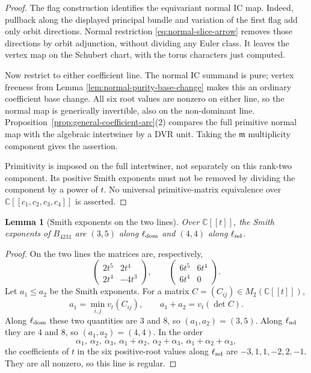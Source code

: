 \documentclass[11pt]{amsart}
\newtheorem{lemma}[theorem]{Lemma}
\theoremstyle{definition}
\theoremstyle{remark}
\newcommand{\C}{\mathbb C}
\begin{document}
\begin{proof}
The flag construction identifies the equivariant normal IC map.
Indeed, pullback along the displayed principal bundle and variation
of the first flag add only orbit directions.  Normal restriction
\eqref{eq:normal-slice-arrow} removes those directions by orbit
adjunction, without dividing any Euler class.  It leaves the vertex
map on the Schubert chart, with the torus characters just computed.

Now restrict to either coefficient line.  The normal IC summand is
pure; vertex freeness from Lemma
\ref{lem:normal-purity-base-change} makes this an ordinary coefficient
base change.  All six root values are nonzero on either line, so the
normal map is generically invertible, also on the non-dominant line.
Proposition~\ref{prop:general-coefficient-arc}(2) compares the full
primitive normal map with the algebraic intertwiner by a DVR unit.
Taking the $\mathfrak m$ multiplicity component gives the assertion.

Primitivity is imposed on the full intertwiner, not separately on
this rank-two component.  Its positive Smith exponents must not be
removed by dividing the component by a power of $t$.  No universal
primitive-matrix equivalence over
$\mathbb C[[c_1,c_2,c_3,c_4]]$ is asserted.
\end{proof}

\begin{lemma}[Smith exponents on the two lines]\label{lem:appendix-smith}
Over $\C[[t]]$, the Smith exponents of
$B_{4231}$ are $(3,5)$ along $\ell_{\rm dom}$ and $(4,4)$ along
$\ell_{\rm nd}$.
\end{lemma}

\begin{proof}
On the two lines the matrices are, respectively,
\[
 \begin{pmatrix}2t^5&2t^4\\2t^4&-4t^3\end{pmatrix},
 \qquad
 \begin{pmatrix}6t^5&6t^4\\6t^4&0\end{pmatrix}.
\]
Let $a_1\leq a_2$ be the Smith exponents.  For a matrix
$C=(C_{ij})\in M_2(\mathbb C[[t]])$,
\[
 a_1=\min_{i,j}v_t(C_{ij}),\qquad
 a_1+a_2=v_t(\det C).
\]
Along $\ell_{\rm dom}$ these two quantities are $3$ and $8$, so
$(a_1,a_2)=(3,5)$.  Along $\ell_{\rm nd}$ they are $4$ and $8$, so
$(a_1,a_2)=(4,4)$.  In the order
\[
 \alpha_1,\ \alpha_2,\ \alpha_3,\ \alpha_1+\alpha_2,\
 \alpha_2+\alpha_3,\ \alpha_1+\alpha_2+\alpha_3,
\]
the coefficients of $t$ in the six positive-root values along
$\ell_{\rm nd}$ are $-3,1,1,-2,2,-1$.  They are all nonzero, so this line is
regular.
\end{proof}
\end{document}
